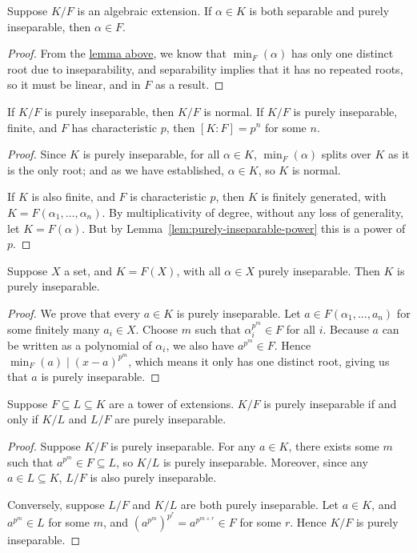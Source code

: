 \begin{theorem}
    Suppose \(K/F\) is an algebraic extension.
    If \(\alpha \in K\) is both separable and purely inseparable,
    then \(\alpha \in F\).
\end{theorem}
\begin{proof}
    From the \hyperref[lem:purely-inseparable-power]{lemma above},
    we know that \(\min_F(\alpha)\) has only one distinct root due to inseparability,
    and separability implies that it has no repeated roots,
    so it must be linear, and in \(F\) as a result.
\end{proof}
\begin{theorem}
    If \(K/F\) is purely inseparable, then \(K/F\) is normal.
    If \(K/F\) is purely inseparable, finite, and \(F\) has characteristic \(p\),
    then \([K:F] = p^n\) for some \(n\).
\end{theorem}
\begin{proof}
    Since \(K\) is purely inseparable, for all \(\alpha \in K\),
    \(\min_F(\alpha)\) splits over \(K\) as it is the only root;
    and as we have established, \(\alpha \in K\), so \(K\) is normal.

    If \(K\) is also finite, and \(F\) is characteristic \(p\),
    then \(K\) is finitely generated, with \(K = F(\alpha_1,\hdots,\alpha_n)\).
    By multiplicativity of degree, without any loss of generality, let \(K = F(\alpha)\).
    But by Lemma~\ref{lem:purely-inseparable-power} this is a power of \(p\).
\end{proof}
\begin{theorem}
    Suppose \(X\) a set, and \(K = F(X)\),
    with all \(\alpha \in X\) purely inseparable.
    Then \(K\) is purely inseparable.
\end{theorem}
\begin{proof}
    We prove that every \(a \in K\) is purely inseparable.
    Let \(a \in F(\alpha_1,\hdots,a_n)\) for some finitely many \(a_i \in X\).
    Choose \(m\) such that \(\alpha_i^{p^m} \in F\) for all \(i\).
    Because \(a\) can be written as a polynomial of \(\alpha_i\),
    we also have \(a^{p^m} \in F\).
    Hence \(\min_F(a) \mid {(x-a)}^{p^m}\), which means it only has one distinct root,
    giving us that \(a\) is purely inseparable.
\end{proof}
\begin{theorem}
    Suppose \(F \subseteq L \subseteq K\) are a tower of extensions.
    \(K/F\) is purely inseparable if and only if
    \(K/L\) and \(L/F\) are purely inseparable.
\end{theorem}
\begin{proof}
    Suppose \(K/F\) is purely inseparable.
    For any \(a \in K\), there exists some \(m\) such that \(a^{p^m} \in F \subseteq L\),
    so \(K/L\) is purely inseparable.
    Moreover, since any \(a \in L \subseteq K\), \(L/F\) is also purely inseparable.

    Conversely, suppose \(L/F\) and \(K/L\) are both purely inseparable.
    Let \(a \in K\), and \(a^{p^m} \in L\) for some \(m\),
    and \({(a^{p^m})}^{p^r} = a^{p^{m+r}} \in F\) for some \(r\).
    Hence \(K/F\) is purely inseparable.
\end{proof}

